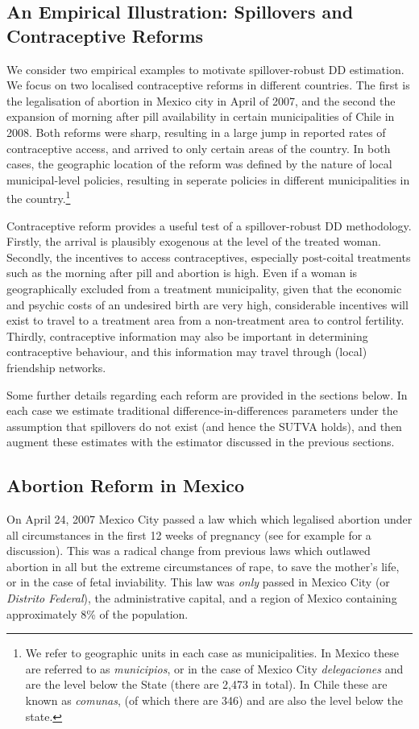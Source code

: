 \documentclass{article}
\begin{document}
\begin{spacing}{1.1}
\section{An Empirical Illustration: Spillovers and Contraceptive Reforms}
We consider two empirical examples to motivate spillover-robust DD estimation.
We focus on two localised contraceptive reforms in different countries. The first
is the legalisation of abortion in Mexico city in April of 2007, and the second
the expansion of morning after pill availability in certain municipalities of 
Chile in 2008.  Both reforms were sharp, resulting in a large jump in reported
rates of contraceptive access, and arrived to only certain areas of the country.
In both cases, the geographic location of the reform was defined by the nature
of local municipal-level policies, resulting in seperate policies in different
municipalities in the country.\footnote{We refer to geographic units in each case
as municipalities.  In Mexico these are referred to as \emph{municipios}, or in 
the case of Mexico City \emph{delegaciones} and are the level below the State 
(there are 2,473 in total).  In Chile these are known as \emph{comunas}, (of 
which there are 346) and are also the level below the state.}

Contraceptive reform provides a useful test of a spillover-robust DD methodology.
Firstly, the arrival is plausibly exogenous at the level of the treated woman.
Secondly, the incentives to access contraceptives, especially post-coital 
treatments such as the morning after pill and abortion is high.  Even if a woman
is geographically excluded from a treatment municipality, given that the economic
and psychic costs of an undesired birth are very high, considerable incentives
will exist to travel to a treatment area from a non-treatment area to control
fertility.  Thirdly, contraceptive information may also be important in
determining contraceptive behaviour, and this information may travel through
(local) friendship networks.

Some further details regarding each reform are provided in the sections below.
In each case we estimate traditional difference-in-differences parameters under
the assumption that spillovers do not exist (and hence the SUTVA holds), and
then augment these estimates with the estimator discussed in the previous
sections.

\subsection{Abortion Reform in Mexico}
On April 24, 2007 Mexico City passed a law which which legalised abortion 
under all circumstances in the first 12 weeks of pregnancy (see for example
\citet{Fraser2014} for a discussion).  This was a radical change from previous 
laws which outlawed abortion in all but the extreme circumstances of rape, 
to save the mother's life, or in the case of fetal inviability.  This law was 
\emph{only} passed in Mexico City (or \emph{Distrito Federal}), the 
administrative capital, and a region of Mexico containing approximately 8\% 
of the population.


\end{spacing}
\end{document}
